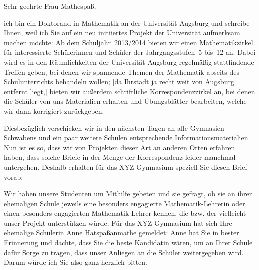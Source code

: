 \documentclass{zirkelbrief}
\begin{document}
\renewcommand{\anschrift}{%
      Holbein-Gymnasium Augsburg \\
      Fachbereich Mathematik \\
      Hallstraße 10 \\
      86150 Augsburg}
\renewcommand{\datum}{\today}
\renewcommand{\betreff}{Matheschülerzirkel der Universität Augsburg}
\renewcommand{\absender}{%
      \textbf{Ingo Blechschmidt} \\
      \ \\
      Lehrstuhl für Algebra und Zahlentheorie \\
      Universitätsstr. 14 \\
      86159 Augsburg \\
      \ \\
      Telefon \> +49 (0) 821 598 -- 5601 \\
      Telefax \> +49 (0) 821 598 -- 2090 \\
      \textsf{blechschmidt@math.uni-augsburg.de} \\}

\makeletterhead

Sehr geehrte Frau Mathespaß,

ich bin ein Doktorand in Mathematik an der Universität Augsburg und schreibe
Ihnen, weil ich Sie auf ein neu initiiertes Projekt der Universität aufmerksam machen
möchte: Ab dem Schuljahr~2013/2014 bieten wir einen Mathematikzirkel für
interessierte Schülerinnen und Schüler der Jahrgangsstufen~5 bis~12 an. Dabei
wird es in den Räumlichkeiten der Universität Augsburg regelmäßig stattfindende
Treffen geben, bei denen wir spannende Themen der Mathematik abseits des
Schulunterrichts behandeln wollen; [da Ihrstadt ja recht weit von Augsburg
entfernt liegt,] bieten wir außerdem schriftliche Korrespondenzzirkel an, bei
denen die Schüler von uns Materialien erhalten und Übungsblätter bearbeiten,
welche wir dann korrigiert zurückgeben.

Diesbezüglich verschicken wir in den nächsten Tagen an alle Gymnasien Schwabens
und ein paar weitere Schulen entsprechende Informationsmaterialien. Nun ist es
so, dass wir von Projekten dieser Art an anderen Orten erfahren haben, dass
solche Briefe in der Menge der Korrespondenz leider manchmal untergehen.
Deshalb erhalten für das XYZ-Gymnasium speziell Sie diesen Brief vorab:

Wir haben unsere Studenten um Mithilfe gebeten und sie gefragt, ob sie an ihrer
ehemaligen Schule jeweils eine besonders engagierte Mathematik-Lehrerin oder einen besonders
engagierten Mathematik-Lehrer kennen, die bzw. der
vielleicht unser Projekt unterstützen würde. Für das XYZ-Gymnasium hat sich
Ihre ehemalige Schülerin Anne Hatspaßanmathe gemeldet: Anne hat Sie in bester
Erinnerung und dachte, dass Sie die beste Kandidatin wären, um an Ihrer Schule
dafür Sorge zu tragen, dass unser Anliegen an die Schüler
weitergegeben wird. Darum würde ich Sie also ganz herzlich bitten.
\end{document}
